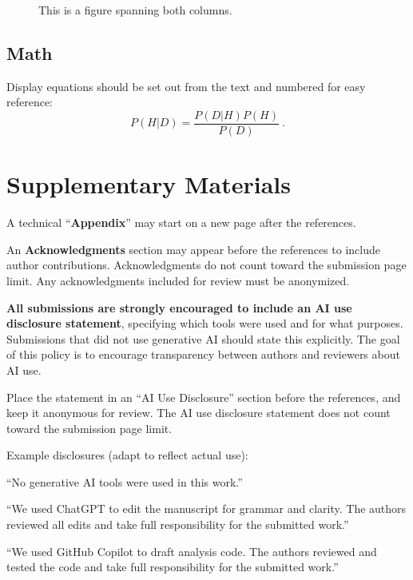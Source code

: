 \documentclass{ccn}  %
\begin{document}
\begin{figure}[ht]
  \begin{center}
    \fbox{\rule[-.5cm]{0cm}{4cm} \rule[-.5cm]{12cm}{0cm}}
  \end{center}
  \caption{This is a figure spanning both columns.}
  \label{sample-figure-wide}
\end{figure}

\subsection{Math}

Display equations should be set out from the text and numbered for easy reference:
\begin{equation}
  P(H|D) = \frac{P(D|H)P(H)}{P(D)}~.
\end{equation}

\section{Supplementary Materials}

A technical ``{\bf Appendix}'' may start on a new page after the references.

An {\bf Acknowledgments} section may appear before the references to include author
contributions.
Acknowledgments do not count toward the submission page limit.
Any acknowledgments included for review must be anonymized.

\textbf{All submissions are strongly encouraged to include an AI use disclosure statement},
specifying which tools were used and for what purposes.
Submissions that did not use generative AI should state this explicitly.
The goal of this policy is to encourage transparency between authors and reviewers about AI use.

Place the statement in an ``AI Use Disclosure'' section before the references,
and keep it anonymous for review.
The AI use disclosure statement does not count toward the submission page limit.

Example disclosures (adapt to reflect actual use):

``No generative AI tools were used in this work.''

``We used ChatGPT to edit the manuscript for grammar and clarity.
The authors reviewed all edits and take full responsibility for
the submitted work.''

``We used GitHub Copilot to draft analysis code.
The authors reviewed and tested the code and take full responsibility for
the submitted work.''
\end{document}
